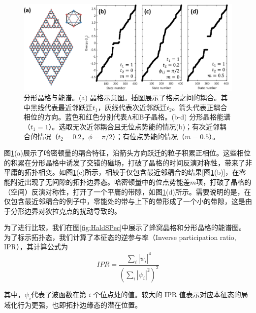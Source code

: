 \begin{figure}[htbp]
    \centering
    \includegraphics[width=1\linewidth]{figure/FracHaldTheo/FractalSpectrum.png}
    \caption{分形晶格与能谱。(a) 晶格示意图。插图展示了格点之间的耦合。其中黑线代表最近邻跃迁$t_1$，灰线代表次近邻跃迁$t_2$。箭头代表正耦合相位的方向。蓝色和红色分别代表A和B子晶格。(b-d) 分形晶格能谱（$t_1=1$）。选取无次近邻耦合且无位点势能的情况(b)；有次近邻耦合的情况（$t_2=0.2，\phi=\pi/2$）；有位点势能的情况（$m=0.5$）。}
    \label{fig:FractalSpectrum}
\end{figure}

图\ref{fig:FractalSpectrum}(a)展示了哈密顿量的耦合特征，沿箭头方向跃迁的粒子积累正相位。这些相位的积累在分形晶格中诱发了交错的磁场，打破了晶格的时间反演对称性，带来了非平庸的拓扑相变。如图\ref{fig:FractalSpectrum}(c)所示，相较于仅包含最近邻耦合的结果[图\ref{fig:FractalSpectrum}(b)]，在零能附近出现了无间隙的拓扑边界态。哈密顿量中的位点势能差\( m \)项，打破了晶格的（空间）反演对称性，打开了一个平庸的带隙，如图\ref{fig:FractalSpectrum}(d)所示。需要说明的是，在仅包含最近邻耦合的例子中，零能处的带与上下的带形成了一个小的带隙，这是由于分形边界对狄拉克点的扰动导致的。

为了进行比较，我们在图\ref{fig:HaldSPec}中展示了蜂窝晶格和分形晶格的能谱图。为了标示拓扑态，我们计算了本征态的逆参与率（Inverse participation ratio, IPR），其计算公式为
\begin{equation}
    IPR=\frac{\sum_i |\psi_i|^4}{\left(\sum_i |\psi_i|^2\right)^2}
\end{equation}

其中，$\psi_i$代表了波函数在第 \(i\) 个位点处的值。较大的 IPR 值表示对应本征态的局域化行为更强，也即拓扑边缘态的潜在位置。

